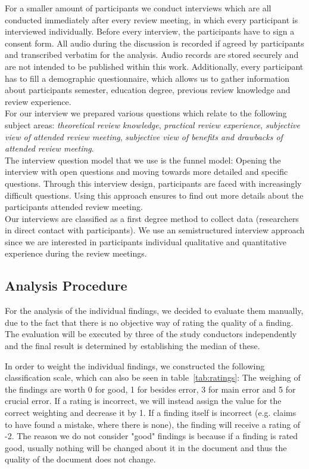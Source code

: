 For a smaller amount of participants we conduct interviews which are all conducted immediately after every review meeting, in which every participant is interviewed individually.  Before every interview, the participants have to sign a consent form. All audio during the discussion is recorded if agreed by participants and transcribed verbatim for the analysis. Audio records are stored securely and are not intended to be published within this work. Additionally, every participant has to fill a demographic questionnaire, which allows us to gather information about participants semester, education degree, previous review knowledge and review experience. \\
For our interview we prepared various questions which relate to the following subject areas: \textit{theoretical review knowledge}, \textit{practical review experience}, \textit{subjective view of attended review meeting}, \textit{subjective view of benefits and drawbacks of attended review meeting}.\\
The interview question model that we use is the funnel model: Opening the interview with open questions and moving towards more detailed and specific questions. Through this interview design, participants are faced with increasingly difficult questions.  Using this approach ensures to find out more details about the participants attended review meeting. \\
Our interviews are classified as a first degree method to collect data (researchers in direct contact with participants). We use an semistructured interview approach since we are interested in participants individual qualitative and quantitative experience during the review meetings.\\


\subsection{Analysis Procedure}

For the analysis of the individual findings, we decided to evaluate them manually, due to the fact that there is no objective way of rating the quality of a finding. The evaluation will be executed by three of the study conductors independently and the final result is determined by establishing the median of these.

In order to weight the individual findings, we constructed the following classification scale, which can also be seen in table~\ref{tab:ratings}:
The weighing of the findings are worth 0 for good, 1 for besides error, 3 for main error and 5 for crucial error. If a rating is incorrect, we will instead assign the value for the correct weighting and decrease it by 1.
If a finding itself is incorrect (e.g. claims to have found a mistake, where there is none), the finding will receive a rating of -2.
The reason we do not consider "good" findings is because if a finding is rated good, usually nothing will be changed about it in the document and thus the quality of the document does not change.

